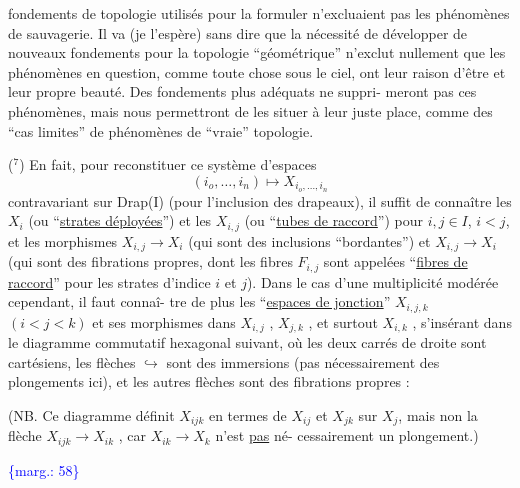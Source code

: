 \documentclass[11pt]{article}
\newcommand{\scanpage}[1]{\par\bigskip\noindent{\small\sffamily[scan #1]}\par}
\newcommand{\mspage}[1]{{\small\sffamily[p.\,#1]}}
\newcommand{\margin}[1]{\textcolor{blue}{\{\textsf{marg.:} #1\}}}
\newcommand{\uline}[1]{\underline{#1}}
\newenvironment{diagramblock}{\par\begin{center}}{\end{center}\par}
\begin{document}
fondements de topologie utilisés pour la formuler n'excluaient
pas les phénomènes de sauvagerie. Il va (je l'espère) sans dire
que la nécessité de développer de nouveaux fondements pour la
topologie ``géométrique'' n'exclut nullement que les phénomènes en
question, comme toute chose sous le ciel, ont leur raison d'être
et leur propre beauté. Des fondements plus adéquats ne suppri-%
meront pas ces phénomènes, mais nous permettront de les situer à
leur juste place, comme des ``cas limites'' de phénomènes de ``vraie''
topologie.

($^7$) En fait, pour reconstituer ce système d'espaces
\[ (i_o,\ldots,i_n) \longmapsto X_{i_o,\ldots,i_n} \]
contravariant sur Drap(I) (pour l'inclusion des drapeaux), il
suffit de connaître les $X_i$ (ou ``\uline{strates déployées}'') et les $X_{i,j}$
(ou ``\uline{tubes de raccord}'') pour $i,j \in I$, $i < j$, et les morphismes
$X_{i,j} \longrightarrow X_i$ (qui sont des inclusions ``bordantes'') et $X_{i,j} \longrightarrow X_i$
(qui sont des fibrations propres, dont les fibres $F_{i,j}$ sont
appelées ``\uline{fibres de raccord}'' pour les strates d'indice $i$ et $j$).
Dans le cas d'une multiplicité modérée cependant, il faut connaî-%
tre de plus les ``\uline{espaces de jonction}'' $X_{i,j,k}$ $(i < j < k)$ et ses
morphismes dans $X_{i,j}$ , $X_{j,k}$ , et surtout $X_{i,k}$ , s'insérant dans
le diagramme commutatif hexagonal suivant, où les deux carrés de
droite sont cartésiens, les flèches $\hookrightarrow$ sont des immersions (pas
nécessairement des plongements ici), et les autres flèches sont
des fibrations propres :

\begin{diagramblock}
\end{diagramblock}

(NB. Ce diagramme définit $X_{ijk}$ en termes de $X_{ij}$ et $X_{jk}$ sur $X_j$,
mais non la flèche $X_{ijk} \longrightarrow X_{ik}$ , car $X_{ik} \longrightarrow X_k$ n'est \uline{pas} né-%
cessairement un plongement.)

\margin{58}

\clearpage
\scanpage{119/59}
\mspage{57}
\end{document}
